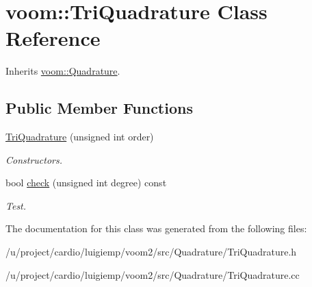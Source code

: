 \hypertarget{classvoom_1_1_tri_quadrature}{
\section{voom::TriQuadrature Class Reference}
\label{classvoom_1_1_tri_quadrature}
}


Inherits \hyperlink{classvoom_1_1_quadrature}{voom::Quadrature}.\subsection*{Public Member Functions}
\begin{DoxyCompactItemize}
\item 
\hypertarget{classvoom_1_1_tri_quadrature_a28624f45052474c3577c4cad71b053a2}{
\hyperlink{classvoom_1_1_tri_quadrature_a28624f45052474c3577c4cad71b053a2}{TriQuadrature} (unsigned int order)}
\label{classvoom_1_1_tri_quadrature_a28624f45052474c3577c4cad71b053a2}

\begin{DoxyCompactList}\small\item\em Constructors. \item\end{DoxyCompactList}\item 
\hypertarget{classvoom_1_1_tri_quadrature_ab3de8be8921558eed98c4c9814fea985}{
bool \hyperlink{classvoom_1_1_tri_quadrature_ab3de8be8921558eed98c4c9814fea985}{check} (unsigned int degree) const }
\label{classvoom_1_1_tri_quadrature_ab3de8be8921558eed98c4c9814fea985}

\begin{DoxyCompactList}\small\item\em Test. \item\end{DoxyCompactList}\end{DoxyCompactItemize}


The documentation for this class was generated from the following files:\begin{DoxyCompactItemize}
\item 
/u/project/cardio/luigiemp/voom2/src/Quadrature/TriQuadrature.h\item 
/u/project/cardio/luigiemp/voom2/src/Quadrature/TriQuadrature.cc\end{DoxyCompactItemize}
